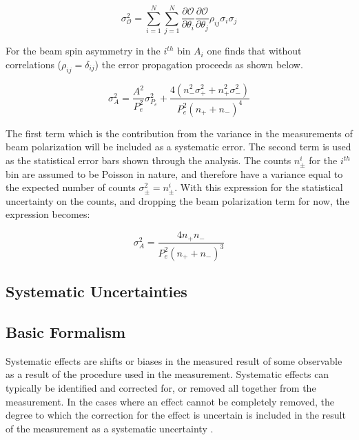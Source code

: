\begin{equation}
  \label{eqn:error-propagation}
  \sigma_{\mathcal{O}}^2 = \sum_{i=1}^{N} \sum_{j=1}^{N} \frac{\partial \mathcal{O}}{\partial \theta_i} \frac{\partial \mathcal{O}}{\partial \theta_j} \rho_{ij} \sigma_i \sigma_j 
\end{equation}
  
For the beam spin asymmetry in the $i^{th}$ bin $A_i$ one finds that without correlations ($\rho_{ij} = \delta_{ij}$) the error propagation proceeds as shown below.

\begin{equation}
  \sigma_{A}^{2} = \frac{A^2}{P_{e}^2} \sigma_{P_{e}}^{2} + \frac{4 (n_{-}^{2} \sigma_{+}^{2}  + n_{+}^{2} \sigma_{-}^{2})}{ P_{e}^{2} (n_{+} + n_{-})^4}
\end{equation} 

The first term which is the contribution from the variance in the measurements of beam polarization will be included as a systematic error.  The second term is used as the statistical error bars shown through the analysis.  The counts $n_{\pm}^{i}$ for the $i^{th}$ bin are assumed to be Poisson in nature, and therefore have a variance equal to the expected number of counts $\sigma_{\pm}^{2} = n_{\pm}^{i}$.  With this expression for the statistical uncertainty on the counts, and dropping the beam polarization term for now, the expression becomes: 

\begin{equation}
  \sigma_{A}^{2} = \frac{4n_+ n_-}{P_{e}^{2} (n_+ + n_-)^3}
\end{equation}

\subsection{Systematic Uncertainties}


\subsection{Basic Formalism}

Systematic effects are shifts or biases in the measured result of some observable as a result of the procedure used in the measurement.  Systematic effects can typically be identified and corrected for, or removed all together from the measurement.  In the cases where an effect cannot be completely removed, the degree to which the correction for the effect is uncertain is included in the result of the measurement as a systematic uncertainty \cite{misc-barlow:2002}. \\

